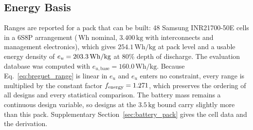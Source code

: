 \subsection{Energy Basis}
\label{sec:energy_basis}
Ranges are reported for a pack that can be built: 48 Samsung INR21700-50E cells in a 6S8P arrangement (\NpackNom\,Wh nominal, $3.400\,\mathrm{kg}$ with interconnects and management electronics), which gives $254.1\,\mathrm{Wh/kg}$ at pack level and a usable energy density of $e_u = 203.3\,\mathrm{Wh/kg}$ at $80\%$ depth of discharge. The evaluation database was computed with $e_{u,\mathrm{base}} = 160.0\,\mathrm{Wh/kg}$. Because Eq.~\eqref{eq:breguet_range} is linear in $e_u$ and $e_u$ enters no constraint, every range is multiplied by the constant factor $f_{\mathrm{energy}} = 1.271$, which preserves the ordering of all designs and every statistical comparison. The battery mass remains a continuous design variable, so designs at the $3.5\,\mathrm{kg}$ bound carry slightly more than this pack. Supplementary Section~\ref{sec:battery_pack} gives the cell data and the derivation.
